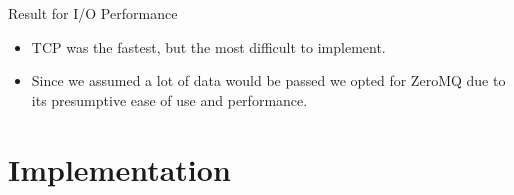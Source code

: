 \documentclass{beamer}
\begin{document}
    \begin{frame}{Result for I/O Performance}
    \begin{itemize}[<+-|alert@+>]
        \item TCP was the fastest, but the most difficult to implement.
        \item Since we assumed a lot of data would be passed we opted for ZeroMQ
              due to its presumptive ease of use and performance.
    \end{itemize}
    \end{frame}


    \section{Implementation}
\end{document}
